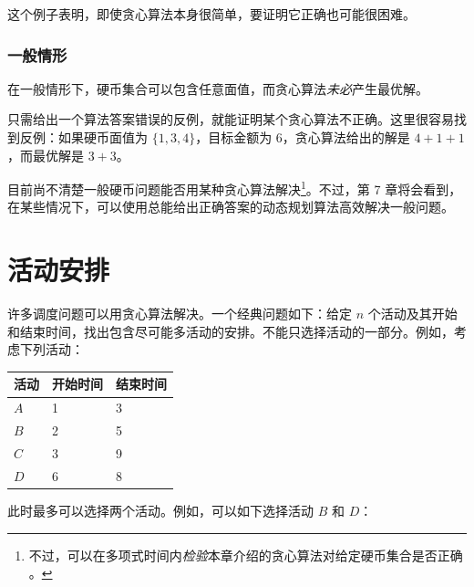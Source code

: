 这个例子表明，即使贪心算法本身很简单，要证明它正确也可能很困难。

\subsubsection{一般情形}

在一般情形下，硬币集合可以包含任意面值，而贪心算法\emph{未必}产生最优解。

只需给出一个算法答案错误的反例，就能证明某个贪心算法不正确。这里很容易找到反例：如果硬币面值为 $\{1,3,4\}$，目标金额为 6，贪心算法给出的解是 $4+1+1$，而最优解是 $3+3$。

目前尚不清楚一般硬币问题能否用某种贪心算法解决\footnote{不过，可以在多项式时间内\emph{检验}本章介绍的贪心算法对给定硬币集合是否正确 \cite{pea05}。}。不过，第 7 章将会看到，在某些情况下，可以使用总能给出正确答案的动态规划算法高效解决一般问题。

\section{活动安排}

许多调度问题可以用贪心算法解决。一个经典问题如下：给定 $n$ 个活动及其开始和结束时间，找出包含尽可能多活动的安排。不能只选择活动的一部分。例如，考虑下列活动：
\begin{center}
\begin{tabular}{lll}
活动 & 开始时间 & 结束时间 \\
\hline
$A$ & 1 & 3 \\
$B$ & 2 & 5 \\
$C$ & 3 & 9 \\
$D$ & 6 & 8 \\
\end{tabular}
\end{center}
此时最多可以选择两个活动。例如，可以如下选择活动 $B$ 和 $D$：
\begin{center}
\end{center}

